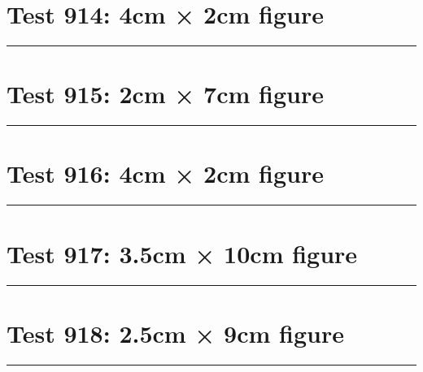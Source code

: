 \documentclass[a4paper,11pt]{article}
\begin{document}
\section*{Test 914: 4cm × 2cm figure}
\begin{swarmwrap}%
  \begin{minipage}[t]{4cm}
    \centering
    \rule{\linewidth}{2cm}
  \end{minipage}%
\end{swarmwrap}%
\swarmwrapnext
\lipsum[26]
\lipsum[27]
\lipsum[28]
\lipsum[29]
\section*{Test 915: 2cm × 7cm figure}
\begin{swarmwrap}%
  \begin{minipage}[t]{2cm}
    \centering
    \rule{\linewidth}{7cm}
  \end{minipage}%
\end{swarmwrap}%
\swarmwrapnext
\lipsum[60]
\lipsum[61]
\lipsum[62]
\lipsum[63]
\lipsum[64]
\lipsum[65]
\section*{Test 916: 4cm × 2cm figure}
\begin{swarmwrap}%
  \begin{minipage}[t]{4cm}
    \centering
    \rule{\linewidth}{2cm}
  \end{minipage}%
\end{swarmwrap}%
\swarmwrapnext
\lipsum[135]
\lipsum[136]
\lipsum[137]
\lipsum[138]
\lipsum[139]
\lipsum[140]
\section*{Test 917: 3.5cm × 10cm figure}
\begin{swarmwrap}%
  \begin{minipage}[t]{3cm}
    \centering
    \rule{\linewidth}{10cm}
  \end{minipage}%
\end{swarmwrap}%
\swarmwrapnext
\lipsum[148]
\lipsum[149]
\lipsum[150]
\lipsum[1]
\lipsum[2]
\lipsum[3]
\section*{Test 918: 2.5cm × 9cm figure}
\begin{swarmwrap}%
  \begin{minipage}[t]{2cm}
    \centering
    \rule{\linewidth}{9cm}
  \end{minipage}%
\end{swarmwrap}%
\swarmwrapnext
\lipsum[22]
\lipsum[23]
\lipsum[24]
\lipsum[25]
\lipsum[26]
\end{document}
